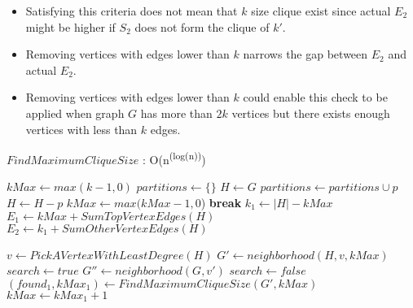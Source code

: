 \documentclass[landscape]{slides}
\begin{document}
\begin{slide}
\begin{itemize}
		\item Satisfying this criteria does not mean that $k$ size clique exist since actual $E_2$ might be higher if $S_2$ does not form the clique of $k'$.
		\item Removing vertices with edges lower than $k$ narrows the gap between $E_2$ and actual $E_2$.
		\item Removing vertices with edges lower than $k$ could enable this check to be applied when graph $G$ has more than $2k$ vertices but there exists enough vertices with less than $k$ edges.
	\end{itemize}
\end{slide}


\begin{slide}
\end{slide}



\begin{algorithm}
	\caption{$FindMaximumCliqueSize$ : O(n\textsuperscript{(log(n))})}
	\begin{algorithmic}[1]
		\State $kMax \gets max(k - 1, 0)$
		\State $partitions \gets \{\}$
		\State $H \gets G$
		\State $partitions \gets partitions \cup p$
		\State $H \gets H - p$
		\State $kMax \gets max(kMax - 1, 0$)
		\EndWhile
		\State \textbf{break}
		\EndIf
		{\color{red} 
		\State $k_1 \gets |H|-kMax$
		\State $E_1 \gets kMax + SumTopVertexEdges(H)$
		\State $E_2 \gets k_1 + SumOtherVertexEdges(H)$
		}
	\end{algorithmic}
\end{algorithm}


\begin{algorithm}
	\begin{algorithmic}[1]
		\EndIf
		\EndIf
		\State $v \gets PickAVertexWithLeastDegree(H)$
		\State $G' \gets neighborhood(H, v, kMax)$
		\State $search \gets true$
		\State $G'' \gets neighborhood(G, v')$
		\State $search \gets false$
		\EndIf
		\EndFor
		\State $(found_1, kMax_1) \gets FindMaximumCliqueSize(G', kMax)$
		\State $kMax \gets kMax_1 + 1$
		\EndIf
		\EndIf
		\EndIf
	\end{algorithmic}
\end{algorithm}
\end{document}
